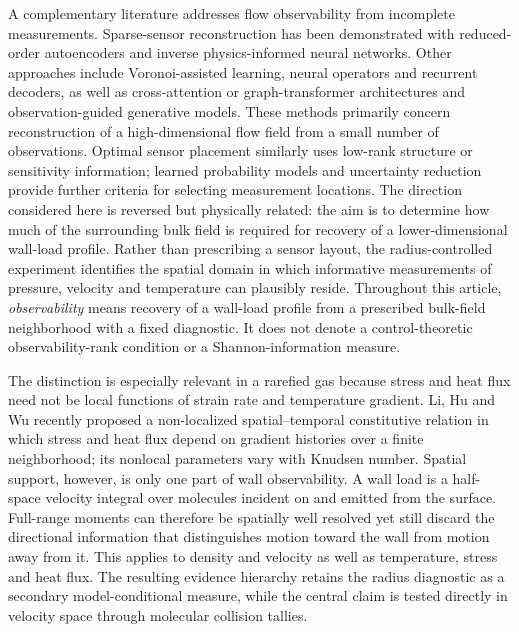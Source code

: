 \documentclass[aip,pof,preprint,notitlepage,floatfix,amsmath,amssymb]{revtex4-2}
\begin{document}
A complementary literature addresses flow observability from incomplete measurements. Sparse-sensor reconstruction has been demonstrated with reduced-order autoencoders and inverse physics-informed neural networks. Other approaches include Voronoi-assisted learning, neural operators and recurrent decoders, as well as cross-attention or graph-transformer architectures and observation-guided generative models.\cite{Luo2023Sparse,HosseiniShiri2024,Fukami2021Sparse,Santos2023Senseiver,Zhao2024RecFNO,Williams2024SHRED,Kong2025CrossAttention,Wang2025Generative,Zhang2026Sparse} These methods primarily concern reconstruction of a high-dimensional flow field from a small number of observations. Optimal sensor placement similarly uses low-rank structure or sensitivity information; learned probability models and uncertainty reduction provide further criteria for selecting measurement locations.\cite{Manohar2018,Erichson2020,Liang2026Sensor} The direction considered here is reversed but physically related: the aim is to determine how much of the surrounding bulk field is required for recovery of a lower-dimensional wall-load profile. Rather than prescribing a sensor layout, the radius-controlled experiment identifies the spatial domain in which informative measurements of pressure, velocity and temperature can plausibly reside. Throughout this article, \emph{observability} means recovery of a wall-load profile from a prescribed bulk-field neighborhood with a fixed diagnostic. It does not denote a control-theoretic observability-rank condition or a Shannon-information measure.

The distinction is especially relevant in a rarefied gas because stress and heat flux need not be local functions of strain rate and temperature gradient. Li, Hu and Wu recently proposed a non-localized spatial--temporal constitutive relation in which stress and heat flux depend on gradient histories over a finite neighborhood; its nonlocal parameters vary with Knudsen number.\cite{LiHuWu2024} Spatial support, however, is only one part of wall observability. A wall load is a half-space velocity integral over molecules incident on and emitted from the surface. Full-range moments can therefore be spatially well resolved yet still discard the directional information that distinguishes motion toward the wall from motion away from it. This applies to density and velocity as well as temperature, stress and heat flux. The resulting evidence hierarchy retains the radius diagnostic as a secondary model-conditional measure, while the central claim is tested directly in velocity space through molecular collision tallies.
\end{document}
